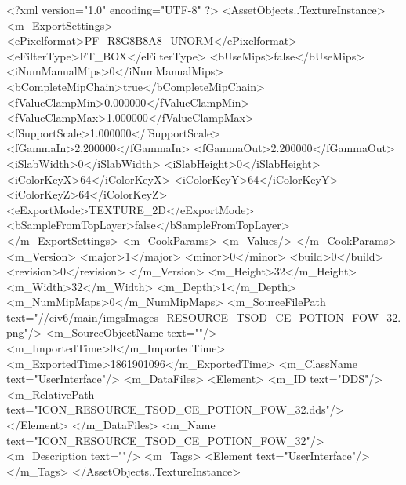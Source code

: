 <?xml version="1.0" encoding="UTF-8" ?>
<AssetObjects..TextureInstance>
	<m_ExportSettings>
		<ePixelformat>PF_R8G8B8A8_UNORM</ePixelformat>
		<eFilterType>FT_BOX</eFilterType>
		<bUseMips>false</bUseMips>
		<iNumManualMips>0</iNumManualMips>
		<bCompleteMipChain>true</bCompleteMipChain>
		<fValueClampMin>0.000000</fValueClampMin>
		<fValueClampMax>1.000000</fValueClampMax>
		<fSupportScale>1.000000</fSupportScale>
		<fGammaIn>2.200000</fGammaIn>
		<fGammaOut>2.200000</fGammaOut>
		<iSlabWidth>0</iSlabWidth>
		<iSlabHeight>0</iSlabHeight>
		<iColorKeyX>64</iColorKeyX>
		<iColorKeyY>64</iColorKeyY>
		<iColorKeyZ>64</iColorKeyZ>
		<eExportMode>TEXTURE_2D</eExportMode>
		<bSampleFromTopLayer>false</bSampleFromTopLayer>
	</m_ExportSettings>
	<m_CookParams>
		<m_Values/>
	</m_CookParams>
	<m_Version>
		<major>1</major>
		<minor>0</minor>
		<build>0</build>
		<revision>0</revision>
	</m_Version>
	<m_Height>32</m_Height>
	<m_Width>32</m_Width>
	<m_Depth>1</m_Depth>
	<m_NumMipMaps>0</m_NumMipMaps>
	<m_SourceFilePath text="//civ6/main/imgs\Processed Images\ICON_RESOURCE_TSOD_CE_POTION_FOW_32.png"/>
	<m_SourceObjectName text=""/>
	<m_ImportedTime>0</m_ImportedTime>
	<m_ExportedTime>1861901096</m_ExportedTime>
	<m_ClassName text="UserInterface"/>
	<m_DataFiles>
		<Element>
			<m_ID text="DDS"/>
			<m_RelativePath text="ICON_RESOURCE_TSOD_CE_POTION_FOW_32.dds"/>
		</Element>
	</m_DataFiles>
	<m_Name text="ICON_RESOURCE_TSOD_CE_POTION_FOW_32"/>
	<m_Description text=""/>
	<m_Tags>
		<Element text="UserInterface"/>
	</m_Tags>
</AssetObjects..TextureInstance>

